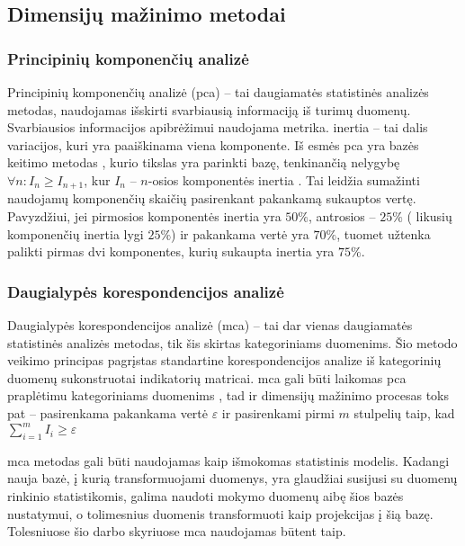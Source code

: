 \subsection{Dimensijų mažinimo metodai}

\subsubsection{Principinių komponenčių analizė}

Principinių komponenčių analizė (\gls{pca}) -- tai daugiamatės statistinės analizės metodas, naudojamas išskirti svarbiausią informaciją iš turimų duomenų. Svarbiausios informacijos apibrėžimui naudojama  metrika. \Gls{inertia} -- tai dalis variacijos, kuri yra paaiškinama viena komponente. Iš esmės \gls{pca} yra bazės keitimo metodas , kurio tikslas yra parinkti bazę, tenkinančią nelygybę $\forall n: I_n \ge I_{n+1}$, kur $I_n$ -- $n$-osios komponentės \gls{inertia} \cite{abdiPrincipalComponentAnalysis2010}. Tai leidžia sumažinti naudojamų komponenčių skaičių pasirenkant pakankamą sukauptos  vertę. Pavyzdžiui, jei pirmosios komponentės \gls{inertia} yra $50\%$, antrosios -- $25\%$ (\rightarrow \; likusių komponenčių \gls{inertia} lygi $25\%$) ir pakankama  vertė yra $70\%$, tuomet užtenka palikti pirmas dvi komponentes, kurių sukaupta \gls{inertia}  yra $75\%$.

\subsubsection{Daugialypės korespondencijos analizė}\label{sec:literature:mca}

Daugialypės korespondencijos analizė (\gls{mca}) -- tai dar vienas daugiamatės statistinės analizės metodas, tik šis skirtas kategoriniams duomenims. Šio metodo veikimo principas pagrįstas standartine korespondencijos analize  iš kategorinių duomenų sukonstruotai indikatorių matricai. \gls{mca} gali būti laikomas \gls{pca} praplėtimu kategoriniams duomenims \cite{abdiMultipleCorrespondenceAnalysis2007}, tad ir dimensijų mažinimo procesas toks pat -- pasirenkama pakankama  vertė $\varepsilon$ ir pasirenkami pirmi $m$ stulpelių taip, kad $\sum_{i=1}^m{I_i} \ge \varepsilon$

\gls{mca} metodas gali būti naudojamas kaip išmokomas statistinis modelis. Kadangi nauja bazė, į kurią transformuojami duomenys, yra glaudžiai susijusi su duomenų rinkinio statistikomis, galima naudoti mokymo duomenų aibę šios bazės nustatymui, o tolimesnius duomenis transformuoti kaip projekcijas į šią bazę. Tolesniuose šio darbo skyriuose \gls{mca} naudojamas būtent taip.